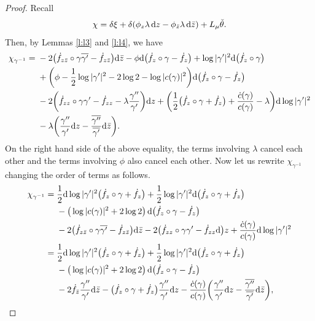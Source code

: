 \documentclass[10pt,a4paper]{amsart}
\numberwithin{equation}{section}
\begin{document}
\begin{proof}
Recall
\begin{gather*}
{\chi}= \delta\xi + \delta(\phi_z \lambda \,{\rm d}z - \phi_{\bar{z}} \lambda\, {\rm d}\bar{z}) + L_{\mu} \check{\theta}.
\end{gather*}
Then, by Lemmas \ref{l:l3} and \ref{l:l4}, we have
\begin{align*}
\chi_{\gamma^{-1}}={}& -2\big(\dot{f}_{z\bar{z}}\circ\gamma\overline{\gamma'}-\dot{f}_{z\bar{z}}\big){\rm d}\bar{z}-\phi {\rm d}\big(\dot{f}_z\circ\gamma-\dot{f}_z\big)+\log|\gamma'|^2 {\rm d}\big(\dot{f}_z\circ\gamma\big)
\\
&+\bigg(\phi-\frac{1}{2}\log|\gamma'|^2-2\log2-\log|c(\gamma)|^2\bigg){\rm d}\big(\dot{f}_z\circ\gamma-\dot{f}_z\big)
\\
&-2\bigg(\dot{f}_{zz}\circ\gamma\gamma'-\dot{f}_{zz}-\lambda\frac{\gamma''}{\gamma'} \bigg){\rm d}z
+\bigg( \frac{1}{2}\big(\dot{f}_z\circ\gamma+\dot{f}_z\big)+\frac{\dot{c}(\gamma)}{c(\gamma)}-\lambda \bigg){\rm d}\log|\gamma'|^2
\\
&-\lambda \bigg(\frac{\gamma''}{\gamma'} {\rm d}z - \frac{\overline{\gamma''}}{\overline{\gamma'}}{\rm d}\bar{z}\bigg).
\end{align*}
On the right hand side of the above equality, the terms involving $\lambda$ cancel each other and the terms
involving $\phi$ also cancel each other. Now let us rewrite $\chi_{\gamma^{-1}}$ changing the order of terms as follows.
\begin{align*}
\chi_{\gamma^{-1}}={}&\frac12 {\rm d}\log|\gamma'|^2 \big(\dot{f}_z\circ \gamma +\dot{f}_z\big)
+\frac12 \log|\gamma'|^2 {\rm d}\big(\dot{f}_z\circ \gamma +\dot{f}_z\big)
\\
&-\big(\log|c(\gamma)|^2+2\log 2\big)\, {\rm d} \big(\dot{f}_z\circ \gamma - \dot{f}_z\big)
\\
&-2\big(\dot{f}_{z\bar{z}}\circ\gamma\overline{\gamma'}-\dot{f}_{z\bar{z}}\big){\rm d}\bar{z}
-2\big(\dot{f}_{zz}\circ\gamma\gamma'-\dot{f}_{zz} {\rm d}\big)z
+\frac{\dot{c}(\gamma)}{c(\gamma)} {\rm d}\log|\gamma'|^2
\\
={}&\frac12 {\rm d}\log|\gamma'|^2 \big(\dot{f}_z\circ \gamma +\dot{f}_z\big)
+\frac12 \log|\gamma'|^2 {\rm d}\big(\dot{f}_z\circ \gamma +\dot{f}_z\big)
\\
&-\big(\log|c(\gamma)|^2+2\log 2\big) \,{\rm d} \big(\dot{f}_z\circ \gamma - \dot{f}_z\big)
\\
&-2\dot{f}_{\bar{z}}\frac{\gamma''}{\gamma'} {\rm d}\bar{z}
-\big(\dot{f}_z\circ \gamma+\dot{f}_z\big)\frac{\gamma''}{\gamma'} {\rm d}z -\frac{\dot{c}(\gamma)}{c(\gamma)} \bigg(\frac{\gamma''}{\gamma'} {\rm d}z - \frac{\overline{\gamma''}}{\overline{\gamma'}} {\rm d}\bar{z}\bigg),

\end{align*}
\end{proof}
\end{document}
